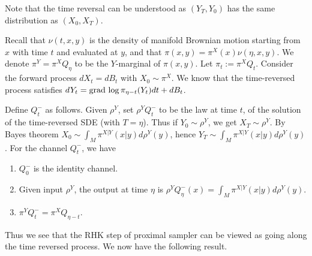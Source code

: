 Note that the time reversal can be understood as $(Y_{T}, Y_{0})$ has the same distribution as $(X_{0}, X_{T})$. 

Recall that $\nu(t, x, y)$ is the density of manifold Brownian motion starting from $x$ with time $t$ and evaluated at $y$,
and that $\pi(x, y) = \pi^{X}(x) \nu(\eta, x, y)$. 
We denote $\pi^{Y} = \pi^{X} Q_{\eta}$ to be the $Y$-marginal of $\pi(x, y)$.
Let $\pi_{t} := \pi^{X} Q_{t}$.
Consider the forward process $dX_{t} = dB_{t}$ with $X_{0} \sim \pi^{X}$. 
We know that the time-reversed process satisfies $dY_{t} = \operatorname{grad\,} \log \pi_{\eta - t} (Y_{t}) dt + dB_{t}$.

Define $Q_{t}^{-}$ as follows. 
Given $\rho^{Y}$, set $\rho^{Y} Q_{t}^{-}$ to be the law at time $t$, of the solution of the time-reversed SDE (with $T = \eta$).
Thus if $Y_{0} \sim \rho^{Y}$, we get $X_{T} \sim \rho^{Y}$. 
By Bayes theorem $X_{0} \sim \int_{M} \pi^{X|Y}(x|y) d\rho^{Y}(y)$, hence $Y_{T} \sim \int_{M} \pi^{X|Y}(x|y) d\rho^{Y}(y)$.
For the channel $Q_{t}^{-}$, we have
\begin{enumerate}
    \item $Q_{0}^{-}$ is the identity channel.
    \item Given input $\rho^{Y}$, the output at time $\eta$ is $\rho^{Y} Q_{\eta}^{-}(x) = \int_{M} \pi^{X|Y}(x|y) d\rho^{Y}(y)$.
    \item $\pi^{Y} Q_{t}^{-} = \pi^{X}Q_{\eta - t }$.
\end{enumerate}
Thus we see that the RHK step of proximal sampler can be viewed as going along the time reversed process. We now have the following result.

